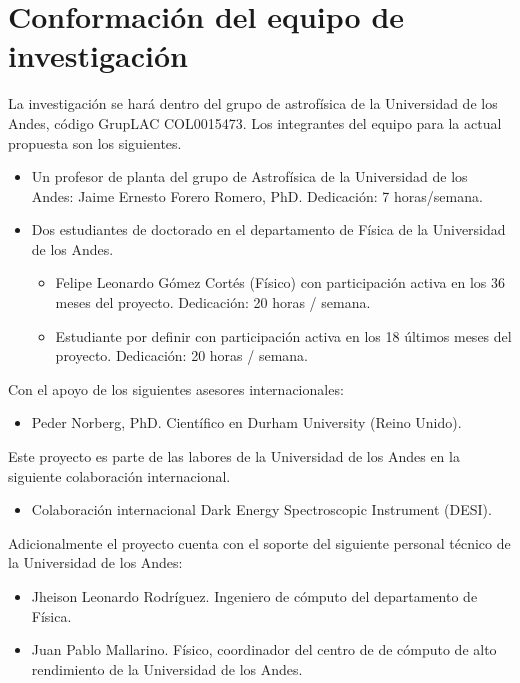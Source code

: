 \section{Conformaci\'on del equipo de investigaci\'on}

La investigaci\'on se har\'a dentro del grupo de astrof\'isica de la
Universidad de los Andes, c\'odigo GrupLAC COL0015473. 
Los integrantes del equipo para la actual propuesta son los
siguientes.  


\begin{itemize}
\item Un profesor de planta del grupo de Astrof\'isica de la
  Universidad de los Andes: Jaime Ernesto  Forero Romero, PhD.
  Dedicaci\'on: 7 horas/semana.
\item Dos estudiantes de doctorado en el departamento de F\'isica de
  la Universidad de los Andes.
\begin{itemize}
\item Felipe Leonardo G\'omez Cort\'es (F\'isico) con participaci\'on
  activa en los 36 meses del proyecto. Dedicaci\'on: 20 horas /
  semana.   
\item Estudiante por definir con participaci\'on activa en los 18 \'ultimos
  meses del proyecto. Dedicaci\'on: 20 horas / semana.  
\end{itemize}
\end{itemize}

\noindent

Con el apoyo de los siguientes asesores internacionales:

\begin{itemize}
\item Peder Norberg, PhD. Cient\'ifico en Durham University (Reino Unido).
\end{itemize}

Este proyecto es parte de las labores de la Universidad de los Andes
en la siguiente colaboraci\'on internacional.

\begin{itemize}
\item Colaboraci\'on internacional Dark Energy Spectroscopic Instrument
(DESI). 
\end{itemize}

\noindent
Adicionalmente el proyecto cuenta con el soporte del siguiente
personal t\'ecnico de la Universidad de los Andes:

\begin{itemize}
\item{Jheison Leonardo Rodr\'iguez. Ingeniero de c\'omputo del
  departamento de F\'isica.} 
\item{Juan Pablo Mallarino. F\'isico, coordinador del centro de de
  c\'omputo de alto rendimiento de la Universidad de los Andes.}
\end{itemize}
